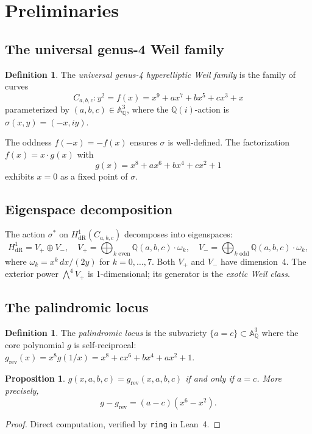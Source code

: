 \documentclass[11pt,a4paper]{article}
\newtheorem{proposition}[theorem]{Proposition}
\theoremstyle{definition}
\newtheorem{definition}[theorem]{Definition}
\theoremstyle{remark}
\newcommand{\QQ}{\mathbb{Q}}
\newcommand{\Aff}{\mathbb{A}}
\begin{document}
\section{Preliminaries}

\subsection{The universal genus-4 Weil family}

\begin{definition}\label{def:universal-family}
The \emph{universal genus-4 hyperelliptic Weil family} is the family of curves
\[
  C_{a,b,c}: y^2 = f(x) = x^9 + ax^7 + bx^5 + cx^3 + x
\]
parameterized by $(a,b,c) \in \Aff^3_\QQ$, where the $\QQ(i)$-action is
$\sigma(x,y) = (-x, iy)$.
\end{definition}

The oddness $f(-x) = -f(x)$ ensures $\sigma$ is well-defined.
The factorization $f(x) = x \cdot g(x)$ with
\[
  g(x) = x^8 + ax^6 + bx^4 + cx^2 + 1
\]
exhibits $x = 0$ as a fixed point of $\sigma$.

\subsection{Eigenspace decomposition}

The action $\sigma^*$ on $H^1_{\mathrm{dR}}(C_{a,b,c})$ decomposes into
eigenspaces:
\[
  H^1_{\mathrm{dR}} = V_+ \oplus V_-, \quad
  V_+ = \bigoplus_{k \text{ even}} \QQ(a,b,c) \cdot \omega_k, \quad
  V_- = \bigoplus_{k \text{ odd}} \QQ(a,b,c) \cdot \omega_k,
\]
where $\omega_k = x^k \, dx/(2y)$ for $k = 0, \ldots, 7$.
Both $V_+$ and $V_-$ have dimension~4.
The exterior power $\bigwedge^4 V_+$ is 1-dimensional; its generator is the
\emph{exotic Weil class}.

\subsection{The palindromic locus}

\begin{definition}
The \emph{palindromic locus} is the subvariety $\{a = c\} \subset \Aff^3_\QQ$
where the core polynomial $g$ is self-reciprocal:
$g_{\mathrm{rev}}(x) = x^8 g(1/x) = x^8 + cx^6 + bx^4 + ax^2 + 1$.
\end{definition}

\begin{proposition}\label{prop:palindromic}
$g(x,a,b,c) = g_{\mathrm{rev}}(x,a,b,c)$ if and only if $a = c$.
More precisely,
\[
  g - g_{\mathrm{rev}} = (a - c)(x^6 - x^2).
\]
\end{proposition}
\begin{proof}
Direct computation, verified by \texttt{ring} in Lean~4.
\end{proof}
\end{document}
